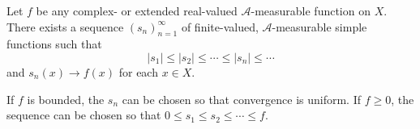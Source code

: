 Let $f$ be any complex- or extended real-valued $\mathcal{A}$-measurable function on $X$. There exists a sequence $(s_n)_{n=1}^{\infty}$ of finite-valued, $\mathcal{A}$-measurable simple functions such that
$$|s_1| \leq |s_2| \leq \cdots \leq |s_n| \leq \cdots$$
and $s_n(x) \to f(x)$ for each $x \in X$.

If $f$ is bounded, the $s_n$ can be chosen so that convergence is uniform. If $f \geq 0$, the sequence can be chosen so that $0 \leq s_1 \leq s_2 \leq \cdots \leq f$.